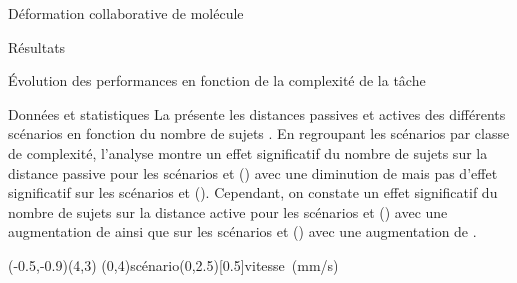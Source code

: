 \documentclass[myfrancais,ngerman,english,frenchb]{mythesis}
\begin{document}
\begin{mychapter}{Déformation collaborative de molécule}
\begin{mysection}{Résultats}
\begin{mysubsection}{Évolution des performances en fonction de la complexité de la tâche}
\begin{mysubsubsection}{Données et statistiques}
					La  présente les distances passives  et actives  des différents scénarios  en fonction du nombre de sujets .
					En regroupant les scénarios par classe de complexité, l'analyse montre un effet significatif du nombre de sujets  sur la distance passive  pour les scénarios  et  () avec une diminution de  mais pas d'effet significatif sur les scénarios  et  ().
					Cependant, on constate un effet significatif du nombre de sujets  sur la distance active  pour les scénarios  et  () avec une augmentation de  ainsi que sur les scénarios  et  () avec une augmentation de .

					\begin{myfigure}
						\begin{myps}(-0.5,-0.9)(4,3)
							\myaxes(0,4){scénario}(0,2.5)[0.5]{vitesse~(mm/s)}
						\end{myps}
					\end{myfigure}


\end{mysubsubsection}
\end{mysubsection}
\end{mysection}
\end{mychapter}
\end{document}
